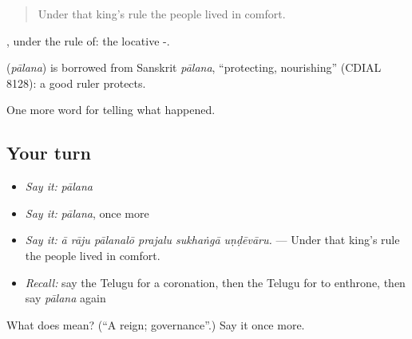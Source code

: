 \begin{quote}
Under that king's rule the people lived in comfort.
\end{quote}

, under the rule of: the locative -.

\begin{cousinweb}
\textbf{} (\emph{pālana}) is borrowed from Sanskrit \emph{pālana}, \textquotedblleft{}protecting, nourishing\textquotedblright{} (CDIAL 8128): a good ruler protects.
\end{cousinweb}

\begin{grammarlens}[title={What you've built}]
One more word for telling what happened.
\end{grammarlens}

\subsection*{Your turn}
\begin{itemize}
\raggedright
  \item \emph{Say it:} \emph{pālana}
  \item \emph{Say it:} \emph{pālana}, once more
  \item \emph{Say it:} \emph{ā rāju pālanalō prajalu sukhaṅgā uṇḍēvāru.} — Under that king's rule the people lived in comfort.
  \item \emph{Recall:} say the Telugu for a coronation, then the Telugu for to enthrone, then say \emph{pālana} again
\end{itemize}

\begin{tcolorbox}[breakable,colback=teal!4,colframe=teal!35!black,title={Before you move on}]
What does  mean? (\textquotedblleft{}A reign; governance\textquotedblright{}.) Say it once more.
\end{tcolorbox}

